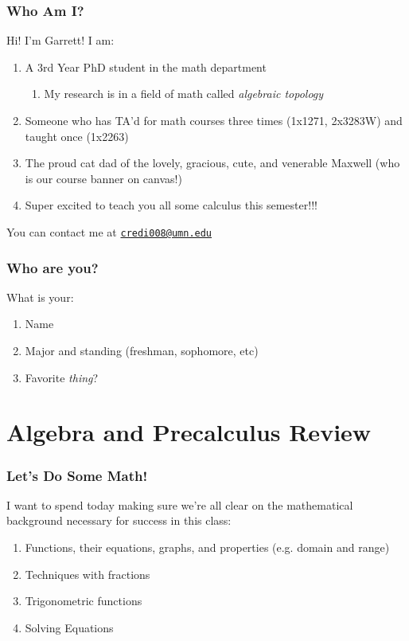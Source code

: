 \documentclass{ltx-talk}
\begin{document}
\begin{frame}
  \frametitle{Who Am I?}

  Hi! I'm Garrett! I am: \pause
  \begin{enumerate}
    \item A 3rd Year PhD student in the math department \pause
      \begin{enumerate}
        \item My research is in a field of math called \textit{algebraic topology} \pause
      \end{enumerate}
    \item Someone who has TA'd for math courses three times (1x1271, 2x3283W) and taught once (1x2263) \pause
    \item The proud cat dad of the lovely, gracious, cute, and venerable Maxwell (who is our course banner on canvas!) \pause
    \item Super excited to teach you all some calculus this semester!!! \pause
  \end{enumerate}

  You can contact me at \href{mailto:credi008@umn.edu?subject=[MATH 1271]}{\nolinkurl{credi008@umn.edu}}
\end{frame}

\begin{frame}
  \frametitle{Who are you?}

  What is your:
  \begin{enumerate}
    \item Name \pause
    \item Major and standing (freshman, sophomore, etc)
    \item Favorite \textit{thing}?
  \end{enumerate}
\end{frame}

\section{Algebra and Precalculus Review}

\begin{frame}
  \frametitle{Let's Do Some Math!}

  I want to spend today making sure we're all clear
  on the mathematical background
  necessary for success in this class: \pause
  \begin{enumerate}
    \item Functions, their equations, graphs, and properties (e.g. domain and range)\pause
    \item Techniques with fractions \pause
    \item Trigonometric functions \pause
    \item Solving Equations
  \end{enumerate}
\end{frame}
\end{document}
